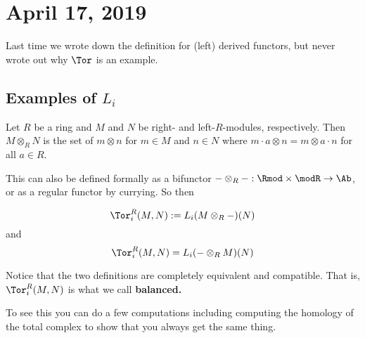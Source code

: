 \documentclass[12pt]{article}
\begin{document}
\section{April 17, 2019}
Last time we wrote down the definition for (left) derived functors, but never wrote out why $\Tor$ is an example.
\subsection{Examples of $L_i$}
Let $R$ be a ring and $M$ and $N$ be right- and left-$R$-modules, respectively. Then $M\otimes_RN$ 
is the set of $m\otimes n$ for $m\in M$ and $n\in N$ where $m\cdot a\otimes n=m\otimes a\cdot n$
for all $a\in R$.

This can also be defined formally as a bifunctor $-\otimes_R-:\Rmod\times\modR\to\Ab$, or as a regular
functor by currying. So then

\begin{defn}
	\[\Tor_i^R(M,N):=L_i(M\otimes_R-)(N)\]
	and
	\[\Tor_i^R(M,N)=L_i(-\otimes_R M)(N)\]
\end{defn}
\begin{rmk}
	Notice that the two definitions are completely equivalent and compatible. That is, $\Tor_i^R(M,N)$ 
	is what we call \textbf{balanced.}

	To see this you can do a few computations including computing the homology of the total complex to show that 
	you always get the same thing.
\end{rmk}
\end{document}
